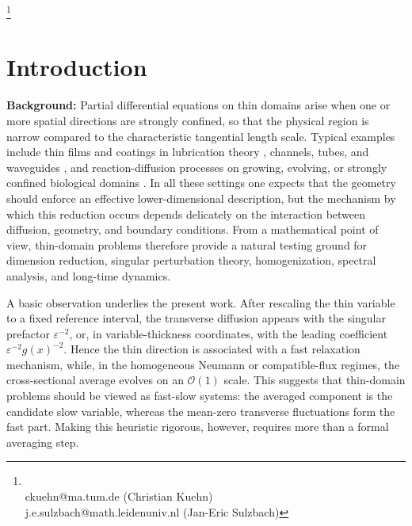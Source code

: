 \documentclass[11pt]{article}
\newcommand\blfootnote[1]{%
	\begingroup
	\renewcommand\thefootnote{}\footnote{#1}%
	\addtocounter{footnote}{-1}%
	\endgroup
}
\theoremstyle{definition}
\theoremstyle{remark}
\numberwithin{equation}{section}
\begin{document}
\vspace{2mm}
	
	
	\vspace{1mm}
	
	\vspace{3mm}
\blfootnote{\textcolor{white}{.}\\[-2.5mm]
	\hspace{-5.4mm}\Letter \; ckuehn@ma.tum.de (Christian Kuehn)  \\[0.8mm]
	\Letter\; j.e.sulzbach@math.leidenuniv.nl (Jan-Eric Sulzbach)
	}

{\hypersetup{linkcolor=black}
    \tableofcontents}


\section{Introduction}

\textbf{Background:} Partial differential equations on thin domains arise when one or more spatial directions are strongly confined, so that the physical region is narrow compared to the characteristic tangential length scale. Typical examples include thin films and coatings in lubrication theory \cite{OronDavisBankoff1997}, channels, tubes, and waveguides \cite{Grieser2008}, and reaction-diffusion processes on growing, evolving, or strongly confined biological domains \cite{CrampinGaffneyMaini1999,li2017limiting,Miura2017,Miura2023,keller2026asymptotic}. In all these settings one expects that the geometry should enforce an effective lower-dimensional description, but the mechanism by which this reduction occurs depends delicately on the interaction between diffusion, geometry, and boundary conditions. From a mathematical point of view, thin-domain problems therefore provide a natural testing ground for dimension reduction, singular perturbation theory, homogenization, spectral analysis, and long-time dynamics.

A basic observation underlies the present work. After rescaling the thin variable to a fixed reference interval, the transverse diffusion appears with the singular prefactor $\varepsilon^{-2}$, or, in variable-thickness coordinates, with the leading coefficient $\varepsilon^{-2}g(x)^{-2}$. Hence the thin direction is associated with a fast relaxation mechanism, while, in the homogeneous Neumann or compatible-flux regimes, the cross-sectional average evolves on an $\mathcal O(1)$ scale. This suggests that thin-domain problems should be viewed as fast-slow systems: the averaged component is the candidate slow variable, whereas the mean-zero transverse fluctuations form the fast part. Making this heuristic rigorous, however, requires more than a formal averaging step. 
\end{document}
